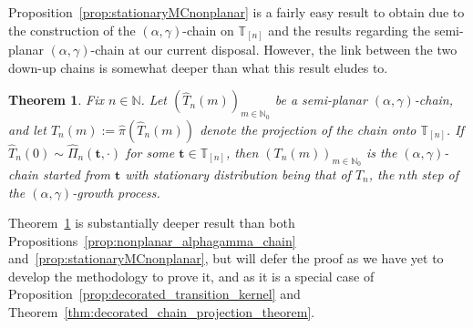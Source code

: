 \documentclass[a4paper, final]{amsart}
\theoremstyle{plain}
\newtheorem{thm}{Theorem}[section]
\theoremstyle{definition}
\newtheorem{ex}[thm]{Example}
\newcommand{\tree}[1][t]{\boldsymbol{#1}}
\newcommand{\that}[1][t]{\hat{\boldsymbol{#1}}} %
\newcommand{\That}[1][T]{\widehat{#1}}
\newcommand{\T}{\mathbb{T}}
\DeclareMathOperator{\tildei}{\tilde{\textit{\i}}}
\newcommand{\nin}{{n \in \mathbb{N}}}
\newcommand{\N}{\mathbb{N}}
\begin{document}
%
Proposition~\ref{prop:stationaryMCnonplanar} is a fairly easy result to obtain due to the construction of the $(\alpha, \gamma)$-chain on $\T_{[n]}$ and the results regarding the semi-planar $(\alpha, \gamma)$-chain at our current disposal.
However, the link between the two down-up chains is somewhat deeper than what this result eludes to.
%
\begin{thm}\label{thm:nonplanar_alphagamma_chain}
  Fix $\nin$.
  Let ${\left( \That_n(m) \right)}_{m \in \N_0}$ be a semi-planar $(\alpha, \gamma)$-chain, and let $T_n(m) := \hat{\pi} \left( \That_n(m) \right)$ denote the projection of the chain onto $\T_{[n]}$.
  If $\That_n(0) \sim \hat{\Pi}_n(\tree, \cdot)$ for some $\tree \in \T_{[n]}$, then ${\left(T_n(m)\right)}_{m \in \N_0}$ is the $(\alpha, \gamma)$-chain started from $\tree$ with stationary distribution being that of $T_n$, the $n$th step of the $(\alpha, \gamma)$-growth process.
\end{thm}
%
Theorem~\ref{thm:nonplanar_alphagamma_chain} is substantially deeper result than both Propositions~\ref{prop:nonplanar_alphagamma_chain} and~\ref{prop:stationaryMCnonplanar}, but will defer the proof as we have yet to develop the methodology to prove it, and as it is a special case of Proposition~\ref{prop:decorated_transition_kernel} and Theorem~\ref{thm:decorated_chain_projection_theorem}.
%
%
\end{document}

